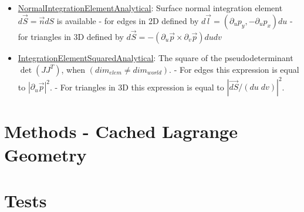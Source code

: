 \documentclass[12pt]{article}
\begin{document}
\begin{itemize}
\item \uline{NormalIntegrationElementAnalytical}: Surface normal integration element $d\vec{S} = \vec{n} dS $ is available
		\subitem - for edges in 2D defined by $d\vec{l} = (\partial_u p_y, -\partial_u p_x) du$
		\subitem - for triangles in 3D defined by $d \vec{S} = -(\partial_u \vec{p} \times \partial_v \vec{p}) du dv $
\item \uline{IntegrationElementSquaredAnalytical}: The square of the pseudodeterminant $\det(JJ^T)$, when $(dim_{elem} \neq dim_{world})$.
		\subitem - For edges this expression is equal to $|\partial_u \vec{p}|^2$.
		\subitem - For triangles in 3D this expression is equal to $|\vec{dS} / (du \; dv)|^2$.

\end{itemize}


\section{Methods - Cached Lagrange Geometry}



\section{Tests}
\end{document}
